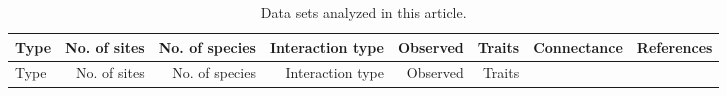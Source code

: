 \begin{longtable}[]{@{}lrrrrrrr@{}}
\caption{Data sets analyzed in this article.
\label{tbl:data}}\tabularnewline
\toprule
\begin{minipage}[b]{0.15\columnwidth}\raggedright\strut
Type\strut
\end{minipage} & \begin{minipage}[b]{0.07\columnwidth}\raggedleft\strut
No. of sites\strut
\end{minipage} & \begin{minipage}[b]{0.07\columnwidth}\raggedleft\strut
No. of species\strut
\end{minipage} & \begin{minipage}[b]{0.11\columnwidth}\raggedleft\strut
Interaction type\strut
\end{minipage} & \begin{minipage}[b]{0.05\columnwidth}\raggedleft\strut
Observed\strut
\end{minipage} & \begin{minipage}[b]{0.04\columnwidth}\raggedleft\strut
Traits\strut
\end{minipage} & \begin{minipage}[b]{0.06\columnwidth}\raggedleft\strut
Connectance\strut
\end{minipage} & \begin{minipage}[b]{0.22\columnwidth}\raggedleft\strut
References\strut
\end{minipage}\tabularnewline
\midrule
\endfirsthead
\toprule
\begin{minipage}[b]{0.15\columnwidth}\raggedright\strut
Type\strut
\end{minipage} & \begin{minipage}[b]{0.07\columnwidth}\raggedleft\strut
No. of sites\strut
\end{minipage} & \begin{minipage}[b]{0.07\columnwidth}\raggedleft\strut
No. of species\strut
\end{minipage} & \begin{minipage}[b]{0.11\columnwidth}\raggedleft\strut
Interaction type\strut
\end{minipage} & \begin{minipage}[b]{0.05\columnwidth}\raggedleft\strut
Observed\strut
\end{minipage} & \begin{minipage}[b]{0.04\columnwidth}\raggedleft\strut
Traits\strut
\end{minipage} & \begin{minipage}[b]{0.06\columnwidth}\raggedleft\strut

\end{minipage}
\end{longtable}
